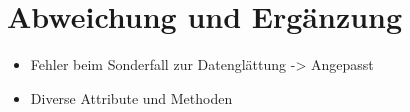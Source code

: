 \chapter{Abweichung und Ergänzung}\label{ch:abweichung-und-ergaenzung}

\begin{itemize}
    \item Fehler beim Sonderfall zur Datenglättung -> Angepasst
    \item Diverse Attribute und Methoden
\end{itemize}